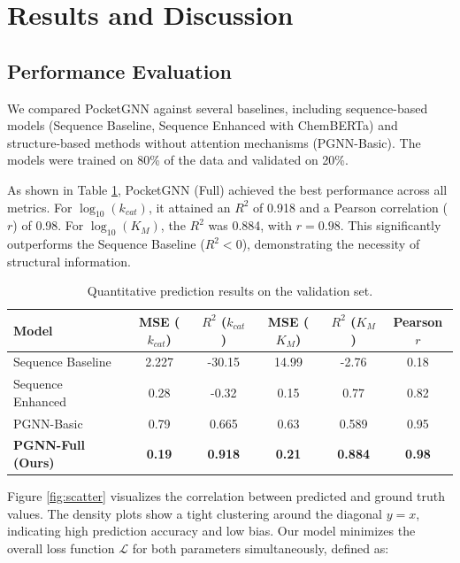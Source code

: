 \documentclass[11pt, a4paper]{article}
\begin{document}
\section{Results and Discussion}
\label{sec:results}

\subsection{Performance Evaluation}
We compared PocketGNN against several baselines, including sequence-based models (Sequence Baseline, Sequence Enhanced with ChemBERTa) and structure-based methods without attention mechanisms (PGNN-Basic). The models were trained on 80\% of the data and validated on 20\%.

As shown in Table \ref{tab:performance}, PocketGNN (Full) achieved the best performance across all metrics. For $\log_{10}(k_{cat})$, it attained an $R^2$ of 0.918 and a Pearson correlation ($r$) of 0.98. For $\log_{10}(K_M)$, the $R^2$ was 0.884, with $r=0.98$. This significantly outperforms the Sequence Baseline ($R^2 < 0$), demonstrating the necessity of structural information.

\begin{table}[htbp]
  \centering
  \caption{Quantitative prediction results on the validation set.}
  \label{tab:performance}
  \begin{tabular}{lccccc}
    \toprule
    Model & MSE ($k_{cat}$) & $R^2$ ($k_{cat}$) & MSE ($K_M$) & $R^2$ ($K_M$) & Pearson $r$ \\
    \midrule
    Sequence Baseline & 2.227 & -30.15 & 14.99 & -2.76 & 0.18 \\
    Sequence Enhanced & 0.28 & -0.32 & 0.15 & 0.77 & 0.82 \\
    PGNN-Basic & 0.79 & 0.665 & 0.63 & 0.589 & 0.95 \\
    \textbf{PGNN-Full (Ours)} & \textbf{0.19} & \textbf{0.918} & \textbf{0.21} & \textbf{0.884} & \textbf{0.98} \\
    \bottomrule
  \end{tabular}
\end{table}

Figure \ref{fig:scatter} visualizes the correlation between predicted and ground truth values. The density plots show a tight clustering around the diagonal $y=x$, indicating high prediction accuracy and low bias. Our model minimizes the overall loss function $\mathcal{L}$ for both parameters simultaneously, defined as:
\end{document}
